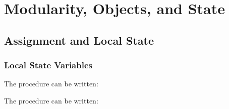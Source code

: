 \chapter{Modularity, Objects, and State}

\section{Assignment and Local State}

\subsection{Local State Variables}

\begin{exe}[3.1]
    The procedure  can be written:
\end{exe}

\begin{exe}[3.2]
    The  procedure can be written:
\end{exe}
